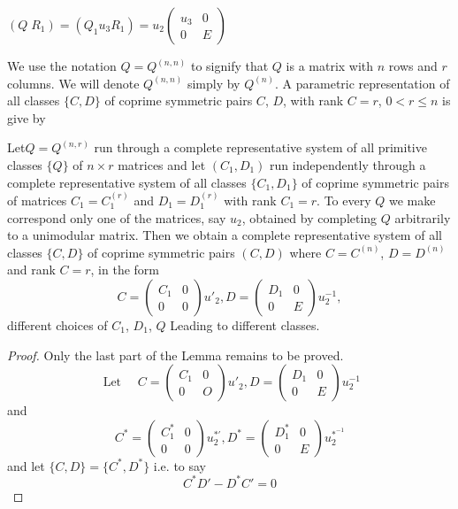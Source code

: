 $(Q \;  R_1) = (Q_1   u_3   R_1) = u_2 \begin{pmatrix}u_3 & 0 \\ 0 & 
    E \end{pmatrix}$ 

We use the notation $Q = Q^{(n,n)}$ to signify that $Q$ is a matrix
with $n$ rows and $r$ columns. We will denote $Q^{(n,n)}$ simply by
$Q^{(n)}$. A parametric representation of all classes $\{C,D \}$ of
coprime symmetric pairs $C$, $D$, with rank $C = r$,  $0 < r \le n$ is
give by 

\begin{lem}\label{chap1:lem1}%
Let\pageoriginale  $Q = Q^{(n, r)}$ run through a complete
representative system 
  of all primitive classes $\{ Q\}$ of $n \times r $  matrices and let
  $(C_1,D_1)$ run independently through a complete representative
  system of all classes $\{ C_1,D_1 \}$ of coprime symmetric pairs of
  matrices $C_1 = C_1^{(r)}$ and $D_1 = D^{(r)}_1$ with rank $C_1 =
  r$. To every $Q$ we make correspond only one of the matrices, say
  $u_2$, obtained by completing $Q$ arbitrarily to a unimodular
  matrix. Then we obtain a complete representative system of all
  classes $\{C,D \}$ of coprime symmetric pairs $(C,D)$ where $C =
  C^{(n)}$, $D = D^{(n)}$ and rank $C = r$, in the form 
\begin{equation*}
C =  \begin{pmatrix}C_1 & 0 \\ 0 & 0 \end{pmatrix}u'_2   ,   D
= \begin{pmatrix}D_1 & 0 \\ 0 & E \end{pmatrix} u^{-1}_2, \tag{21}\label{eq21} 
\end{equation*}
different choices of $C_1$, $D_1$, $Q$ Leading to different classes.
\end{lem} 


\begin{proof}%
Only the last part of the Lemma remains to be proved.
$$
\text{ Let }\quad C =  \begin{pmatrix}C_1 & 0 \\ 0 &
  O \end{pmatrix}u'_2,  D = \begin{pmatrix}D_1 & 0 \\ 0 &
  E \end{pmatrix} u^{-1}_2 
$$
and  
$$
C^* =  \begin{pmatrix}C_1^* & 0 \\ 0 & 0 \end{pmatrix}u^{*'}_2   ,
D^* = \begin{pmatrix}D_1^* & 0 \\ 0 & E \end{pmatrix} u^{*^{-1}}_2 
$$
and let $\{ C, D\} = \{ C^* , D^* \}$ i.e. to say 
\begin{equation*}
C^* D' - D^* C' = 0 \tag{22}\label{eq22} 
\end{equation*}
\end{proof}

